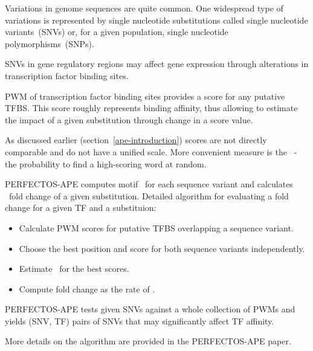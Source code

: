 Variations in genome sequences are quite common. One widespread type of variations is represented by single nucleotide substitutions called single nucleotide variants~(SNVs) or, for a given population, single nucleotide polymorphisms~(SNPs).

SNVs in gene regulatory regions may affect gene expression through alterations in transcription factor binding sites.

PWM of transcription factor binding sites provides a score for any putative TFBS.
This score roughly represents binding affinity, thus allowing to estimate 
the impact of a given substitution through change in a score value.

As discussed earlier (section~\ref{ape-introduction}) scores are not directly comparable and do not have a unified scale. More convenient measure is the \pvalue\ - the probability to find a high-scoring word at random.

PERFECTOS-APE computes motif \pvalues\ for each sequence variant and calculates \pvalue\ fold change of a given substitution. Detailed algorithm for evaluating a fold change for a given TF and a substituion:

\begin{itemize}
\item Calculate PWM scores for putative TFBS overlapping a sequence variant.
\item Choose the best position and score for both sequence variants independently.
\item Estimate \pvalues\ for the best scores.
\item Compute fold change as the rate of \pvalues.
\end{itemize}

PERFECTOS-APE tests given SNVs against a whole collection of PWMs and yields (SNV, TF) pairs of SNVs that may significantly affect TF affinity.

More details on the algorithm are provided in the PERFECTOS-APE paper. \cite{PERFECTOSAPE} 
